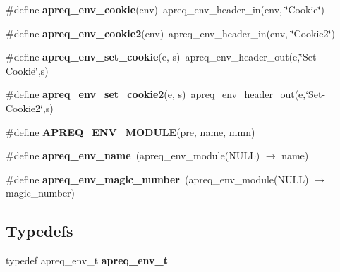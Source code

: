 \begin{CompactItemize}
\item 
\#define {\bf apreq\_\-env\_\-cookie}(env)\ apreq\_\-env\_\-header\_\-in(env, \char`\"{}Cookie\char`\"{})\label{apreq__env_8h_a11}

\item 
\#define {\bf apreq\_\-env\_\-cookie2}(env)\ apreq\_\-env\_\-header\_\-in(env, \char`\"{}Cookie2\char`\"{})\label{apreq__env_8h_a12}

\item 
\#define {\bf apreq\_\-env\_\-set\_\-cookie}(e, s)\ apreq\_\-env\_\-header\_\-out(e,\char`\"{}Set-Cookie\char`\"{},s)\label{apreq__env_8h_a13}

\item 
\#define {\bf apreq\_\-env\_\-set\_\-cookie2}(e, s)\ apreq\_\-env\_\-header\_\-out(e,\char`\"{}Set-Cookie2\char`\"{},s)\label{apreq__env_8h_a14}

\item 
\#define {\bf APREQ\_\-ENV\_\-MODULE}(pre, name, mmn)
\item 
\#define {\bf apreq\_\-env\_\-name}\ (apreq\_\-env\_\-module(NULL) $\rightarrow$ name)\label{apreq__env_8h_a16}

\item 
\#define {\bf apreq\_\-env\_\-magic\_\-number}\ (apreq\_\-env\_\-module(NULL) $\rightarrow$ magic\_\-number)\label{apreq__env_8h_a17}

\end{CompactItemize}
\subsection*{Typedefs}
\begin{CompactItemize}
\item 
typedef apreq\_\-env\_\-t {\bf apreq\_\-env\_\-t}\label{apreq__env_8h_a0}

\end{CompactItemize}
